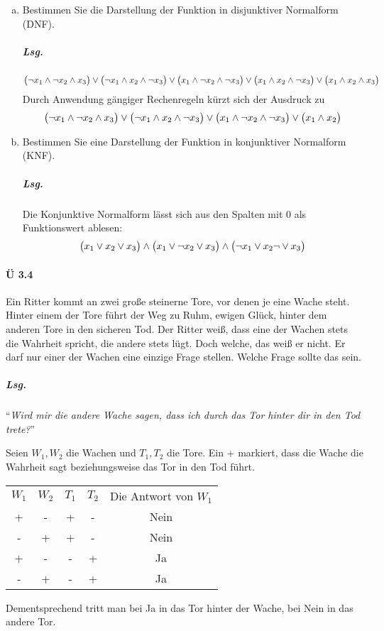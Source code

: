 \documentclass{scrreprt}
\begin{document}
\begin{enumerate}[(a)]
\item Bestimmen Sie die Darstellung der Funktion in disjunktiver Normalform (DNF).
  \subparagraph{Lsg.}
  \[
    \qty\big(\neg x_1 \land \neg x_2 \land x_3) \lor
    \qty\big(\neg x_1 \land x_2 \land \neg x_3) \lor
    \qty\big(x_1 \land \neg x_2 \land \neg x_3) \lor
    \qty\big(x_1 \land x_2 \land \neg x_3) \lor
    \qty\big(x_1 \land x_2 \land x_3)
  \]
  Durch Anwendung gängiger Rechenregeln kürzt sich der Ausdruck zu
  \[
    \qty\big(\neg x_1 \land \neg x_2 \land x_3) \lor
    \qty\big(\neg x_1 \land x_2 \land \neg x_3) \lor
    \qty\big(x_1 \land \neg x_2 \land \neg x_3) \lor
    \qty\big(x_1 \land x_2)
  \]

\item Bestimmen Sie eine Darstellung der Funktion in konjunktiver Normalform (KNF).

  \subparagraph{Lsg.} Die Konjunktive Normalform lässt sich aus den Spalten mit
  0 als Funktionswert ablesen:
  \[
    \qty\big(x_1 \lor x_2 \lor x_3) \land
    \qty\big(x_1 \lor \neg x_2 \lor x_3) \land
    \qty\big(\neg x_1 \lor x_2 \neg \lor x_3)
  \]
\end{enumerate}

\newpage
\paragraph{Ü 3.4} Ein Ritter kommt an zwei große steinerne Tore, vor denen je
eine Wache steht.
Hinter einem der Tore führt der Weg zu Ruhm, ewigen Glück, hinter dem anderen
Tore in den sicheren Tod.
Der Ritter weiß, dass eine der Wachen stets die Wahrheit spricht, die andere
stets lügt.
Doch welche, das weiß er nicht.
Er darf nur einer der Wachen eine einzige Frage stellen.
Welche Frage sollte das sein.

\subparagraph{Lsg.} ``\emph{Wird mir die andere Wache sagen, dass ich durch das
  Tor hinter dir in den Tod trete?}''

Seien $W_1, W_2$ die Wachen und $T_1, T_2$ die Tore.
Ein + markiert, dass die Wache die Wahrheit sagt beziehungsweise das Tor in den
Tod führt.

\begin{tabular}{|ccccc|}
  \hline
  $W_1$ & $W_2$ & $T_1$ & $T_2$ & Die Antwort von $W_1$ \\
  + & - & + & - & Nein \\
  - & + & + & - & Nein \\
  + & - & - & + & Ja \\
  - & + & - & + & Ja \\
  \hline
\end{tabular}

Dementsprechend tritt man bei Ja in das Tor hinter der Wache, bei Nein in das
andere Tor.
\end{document}
